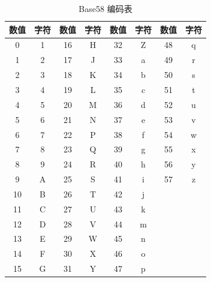 					\begin{table}[!htbp]
					\centering
					\caption{Base58 编码表}
					\label{Base58}
					\begin{tabular}{|c|c|c|c|c|c|c|c|}
					\hline
					数值 & 字符 & 数值 & 字符 & 数值 & 字符 & 数值 & 字符 \\ \hline
					0 & 1 & 16 & H & 32 & Z & 48 & q \\ \hline
					1 & 2 & 17 & J & 33 & a & 49 & r \\ \hline
					2 & 3 & 18 & K & 34 & b & 50 & s \\ \hline
					3 & 4 & 19 & L & 35 & c & 51 & t \\ \hline
					4 & 5 & 20 & M & 36 & d & 52 & u \\ \hline
					5 & 6 & 21 & N & 37 & e & 53 & v \\ \hline
					6 & 7 & 22 & P & 38 & f & 54 & w \\ \hline
					7 & 8 & 23 & Q & 39 & g & 55 & x \\ \hline
					8 & 9 & 24 & R & 40 & h & 56 & y \\ \hline
					9 & A & 25 & S & 41 & i & 57 & z \\ \hline
					10 & B & 26 & T & 42 & j &  &  \\ \hline
					11 & C & 27 & U & 43 & k &  &  \\ \hline
					12 & D & 28 & V & 44 & m &  &  \\ \hline
					13 & E & 29 & W & 45 & n &  &  \\ \hline
					14 & F & 30 & X & 46 & o &  &  \\ \hline
					15 & G & 31 & Y & 47 & p &  &  \\ \hline
					\end{tabular}
					\end{table}

